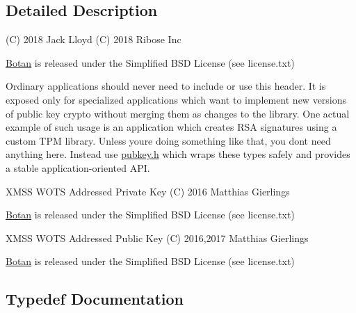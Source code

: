 

\subsection{Detailed Description}
(C) 2018 Jack Lloyd (C) 2018 Ribose Inc

\mbox{\hyperlink{namespace_botan}{Botan}} is released under the Simplified B\+SD License (see license.\+txt)

Ordinary applications should never need to include or use this header. It is exposed only for specialized applications which want to implement new versions of public key crypto without merging them as changes to the library. One actual example of such usage is an application which creates R\+SA signatures using a custom T\+PM library. Unless you\textquotesingle{}re doing something like that, you don\textquotesingle{}t need anything here. Instead use \mbox{\hyperlink{pubkey_8h_source}{pubkey.\+h}} which wraps these types safely and provides a stable application-\/oriented A\+PI.

X\+M\+SS W\+O\+TS Addressed Private Key (C) 2016 Matthias Gierlings

\mbox{\hyperlink{namespace_botan}{Botan}} is released under the Simplified B\+SD License (see license.\+txt)

X\+M\+SS W\+O\+TS Addressed Public Key (C) 2016,2017 Matthias Gierlings

\mbox{\hyperlink{namespace_botan}{Botan}} is released under the Simplified B\+SD License (see license.\+txt) 

\subsection{Typedef Documentation}
\mbox{\label{namespace_botan_a013252aabcb201e0d27b60b1e690886b}} 
